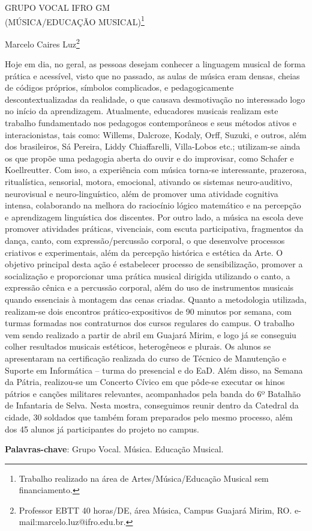 \documentclass[article,12pt,onesidea,4paper,english,brazil]{abntex2}
\begin{document}
	
	
	\frenchspacing 
	
	\begin{center}
		\LARGE GRUPO VOCAL IFRO GM\\(MÚSICA/EDUCAÇÃO MUSICAL)\footnote{Trabalho realizado na área de Artes/Música/Educação Musical sem financiamento.}
		
		\normalsize
	Marcelo Caires Luz\footnote{Professor EBTT 40 horas/DE, área Música, Campus Guajará Mirim, RO. e-mail:marcelo.luz@ifro.edu.br.}  
	\end{center}
	
	\noindent Hoje em dia, no geral, as pessoas desejam conhecer a linguagem musical de forma
	prática e acessível, visto que no passado, as aulas de música eram densas, cheias
	de códigos próprios, símbolos complicados, e pedagogicamente
	descontextualizadas da realidade, o que causava desmotivação no interessado logo
	no início da aprendizagem. Atualmente, educadores musicais realizam este trabalho
	fundamentado nos pedagogos contemporâneos e seus métodos ativos e
	interacionistas, tais como: Willems, Dalcroze, Kodaly, Orff, Suzuki, e outros, além
	dos brasileiros, Sá Pereira, Liddy Chiaffarelli, Villa-Lobos etc.; utilizam-se ainda os
	que propõe uma pedagogia aberta do ouvir e do improvisar, como Schafer e
	Koellreutter. Com isso, a experiência com música torna-se interessante, prazerosa,
	ritualística, sensorial, motora, emocional, ativando os sistemas neuro-auditivo, neurovisual
	e neuro-linguístico, além de promover uma atividade cognitiva intensa,
	colaborando na melhora do raciocínio lógico matemático e na percepção e
	aprendizagem linguística dos discentes. Por outro lado, a música na escola deve
	promover atividades práticas, vivenciais, com escuta participativa, fragmentos da
	dança, canto, com expressão/percussão corporal, o que desenvolve processos
	criativos e experimentais, além da percepção histórica e estética da Arte. O objetivo
	principal desta ação é estabelecer processo de sensibilização, promover a
	socialização e proporcionar uma prática musical dirigida utilizando o canto, a
	expressão cênica e a percussão corporal, além do uso de instrumentos musicais
	quando essenciais à montagem das cenas criadas. Quanto a metodologia utilizada,
	realizam-se dois encontros prático-expositivos de 90 minutos por semana, com
	turmas formadas nos contraturnos dos cursos regulares do campus. O trabalho vem
	sendo realizado a partir de abril em Guajará Mirim, e logo já se conseguiu colher
	resultados musicais estéticos, heterogêneos e plurais. Os alunos se apresentaram
	na certificação realizada do curso de Técnico de Manutenção e Suporte em
	Informática – turma do presencial e do EaD. Além disso, na Semana da Pátria,
	realizou-se um Concerto Cívico em que pôde-se executar os hinos pátrios e canções
	militares relevantes, acompanhados pela banda do 6º Batalhão de Infantaria de
	Selva. Nesta mostra, conseguimos reunir dentro da Catedral da cidade, 30 soldados
	que também foram preparados pelo mesmo processo, além dos 45 alunos já
	participantes do projeto no campus.
	
	\vspace{\onelineskip}
	
	\noindent
	\textbf{Palavras-chave}: Grupo Vocal. Música. Educação Musical.
	
\end{document}
